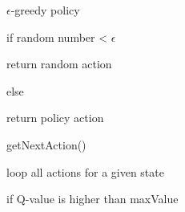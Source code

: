 \documentclass[../Head/Main.tex]{subfiles}
\begin{document}
\begin{Pseudo}{$\epsilon$-greedy policy}{}
	\begin{Indentation}
		\item if random number < $\epsilon$ \vspace{-2pt}
			\begin{Indentation}
				\item return random action \vspace{-2pt}
			\end{Indentation}
		\item else \vspace{-2pt}
		\begin{Indentation}
			\item return policy action
		\end{Indentation}
	\end{Indentation}
\end{Pseudo}


\begin{Pseudo}{getNextAction()}{}
	\begin{Indentation}
		\item loop all actions for a given state \vspace{-2pt}
		\begin{Indentation}
			\item if Q-value is higher than maxValue
		\end{Indentation}
	\end{Indentation}
\end{Pseudo}
\end{document}

